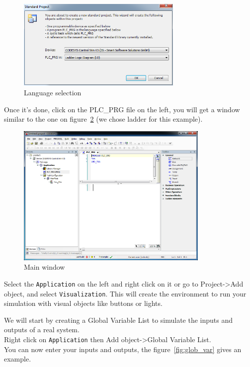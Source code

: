 \documentclass[10pt,a4paper]{article}
\begin{document}
\begin{figure}[h!]
	\begin{center}
		\includegraphics[width=300px]{img3.PNG}
	\end{center}
\caption{Language selection}
\label{fig:select}
\end{figure}

Once it's done, click on the PLC\_PRG file on the left, you will get a window similar to the one on figure~\ref{fig:main} (we chose ladder for this example).

\begin{figure}[h!]
	\begin{center}
		\includegraphics[width=350px]{img4.PNG}
	\end{center}
\caption{Main window}
\label{fig:main}
\end{figure}

Select the \texttt{Application} on the left and right click on it or go to Project->Add object, and select \texttt{Visualization}.
This will create the environment to run your simulation with visual objects like buttons or lights.

We will start by creating a Global Variable List to simulate the inputs and outputs of a real system.\\
Right click on \texttt{Application} then Add object->Global Variable List.\\

You can now enter your inputs and outputs, the figure~\ref{fig:glob_var} gives an example.
\end{document}
